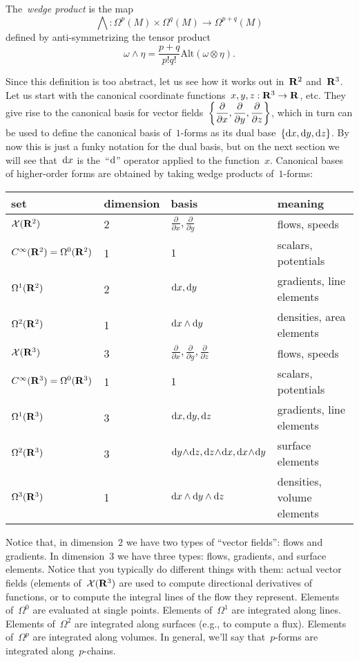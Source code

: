 The~\emph{wedge product} is the map
\[
	\bigwedge:\Omega^p(M)\times\Omega^q(M)\to\Omega^{p+q}(M)
\]
defined by anti-symmetrizing the tensor product
\[
	\omega\wedge\eta=\frac{p+q}{p!q!}\mathrm{Alt}(\omega\otimes\eta).
\]

Since this definition is too abstract, let us see how it works out in~$\mathbf{R}^2$
and~$\mathbf{R}^3$.  Let us start with the canonical coordinate
functions~$x,y,z:\mathbf{R}^3\to\mathbf{R}$, etc.  They give rise to the canonical basis for
vector fields~$\displaystyle\left\{
	\frac\partial{\partial x},
	\frac\partial{\partial y},
	\frac\partial{\partial z}
\right\}
$, which in turn can be used to define the canonical basis of~$1$-forms as
its dual base~$\left\{\mathrm{d} x, \mathrm{d} y, \mathrm{d} z\right\}$.  By now this is just a
funky notation for the dual basis, but on the next section we will see
that~$\mathrm{d} x$ is the~``$\mathrm{d}$'' operator applied to the function~$x$.
Canonical bases of higher-order forms are obtained by taking wedge products
of~$1$-forms:

\begin{tabular}{l|l|l|l}
	set & dimension & basis & meaning \\
	\hline
	$\mathcal{X}(\mathbf{R}^2)$ & 2 &
	$\frac\partial{\partial x}, \frac\partial{\partial y}$ &
	flows, speeds \\
	$C^\infty(\mathbf{R}^2)=\Omega^0(\mathbf{R}^2)$ & 1 & $1$ & scalars, potentials\\
	$\Omega^1(\mathbf{R}^2)$ & 2 & $\mathrm{d} x, \mathrm{d} y$ & gradients, line elements\\
	$\Omega^2(\mathbf{R}^2)$ & 1 & $\mathrm{d} x\wedge \mathrm{d} y$ & densities, area elements\\
	\hline
	$\mathcal{X}(\mathbf{R}^3)$ & 3 &
	$\frac\partial{\partial x}, \frac\partial{\partial y},
	\frac\partial{\partial z}$ & flows, speeds\\
	$C^\infty(\mathbf{R}^3)=\Omega^0(\mathbf{R}^3)$ & 1 & $1$ & scalars, potentials\\
	$\Omega^1(\mathbf{R}^3)$ & 3 & $\mathrm{d} x, \mathrm{d} y, \mathrm{d} z$ & gradients, line elements\\
	$\Omega^2(\mathbf{R}^3)$ & 3 &
	$\mathrm{d} y\!\wedge\!\mathrm{d} z, \mathrm{d} z\!\wedge\!\mathrm{d} x, \mathrm{d} x\!\wedge\!\mathrm{d}
	y$ & surface elements\\
	$\Omega^3(\mathbf{R}^3)$ & 1 & $\mathrm{d} x\wedge\mathrm{d} y\wedge\mathrm{d} z$ & densities, volume
	elements\\
\end{tabular}

Notice that, in dimension~$2$ we have two types of ``vector fields'': flows
and gradients.  In dimension~$3$ we have three types: flows, gradients, and
surface elements.  Notice that you typically do different things with them:
actual vector fields (elements of~$\mathcal{X}(\mathbf{R}^3)$ are used to compute
directional derivatives of functions, or to compute the integral lines of the
flow they represent.  Elements of~$\Omega^0$ are evaluated at single points.
Elements of~$\Omega^1$ are integrated along lines.  Elements of~$\Omega^2$
are integrated along surfaces (e.g., to compute a flux).  Elements
of~$\Omega^p$ are integrated along volumes.  In general, we'll say
that~$p$-forms are integrated along~$p$-chains.

